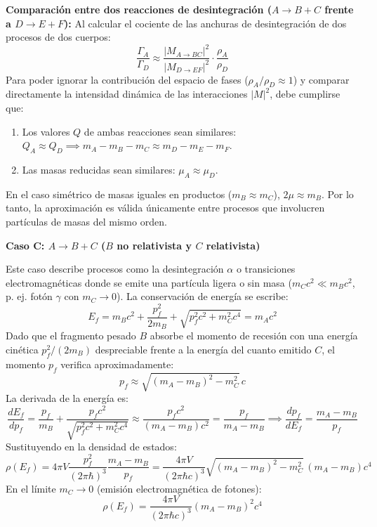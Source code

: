 \textbf{Comparación entre dos reacciones de desintegración ($A \to B + C$ frente a $D \to E + F$):}
Al calcular el cociente de las anchuras de desintegración de dos procesos de dos cuerpos:
\begin{equation}
\frac{\Gamma_A}{\Gamma_D} \approx \frac{|M_{A \to BC}|^2}{|M_{D \to EF}|^2} \cdot \frac{\rho_A}{\rho_D}
\end{equation}
Para poder ignorar la contribución del espacio de fases ($\rho_A / \rho_D \approx 1$) y comparar directamente la intensidad dinámica de las interacciones $|M|^2$, debe cumplirse que:
\begin{enumerate}
    \item Los valores $Q$ de ambas reacciones sean similares: $Q_A \approx Q_D \implies m_A - m_B - m_C \approx m_D - m_E - m_F$.
    \item Las masas reducidas sean similares: $\mu_A \approx \mu_D$.
\end{enumerate}
En el caso simétrico de masas iguales en productos ($m_B \approx m_C$), $2\mu \approx m_B$. Por lo tanto, la aproximación es válida únicamente entre procesos que involucren partículas de masas del mismo orden.

\textbf{Caso C: $A \to B + C$ ($B$ no relativista y $C$ relativista)}

Este caso describe procesos como la desintegración $\alpha$ o transiciones electromagnéticas donde se emite una partícula ligera o sin masa ($m_C c^2 \ll m_B c^2$, p. ej. fotón $\gamma$ con $m_C \to 0$).
La conservación de energía se escribe:
\begin{equation}
E_f = m_B c^2 + \frac{p_f^2}{2m_B} + \sqrt{p_f^2 c^2 + m_C^2 c^4} = m_A c^2
\end{equation}
Dado que el fragmento pesado $B$ absorbe el momento de recesión con una energía cinética $p_f^2 / (2m_B)$ despreciable frente a la energía del cuanto emitido $C$, el momento $p_f$ verifica aproximadamente:
\begin{equation}
p_f \approx \sqrt{(m_A - m_B)^2 - m_C^2} \, c
\end{equation}
La derivada de la energía es:
\begin{equation}
\frac{dE_f}{dp_f} = \frac{p_f}{m_B} + \frac{p_f c^2}{\sqrt{p_f^2 c^2 + m_C^2 c^4}} \approx \frac{p_f c^2}{(m_A - m_B)c^2} = \frac{p_f}{m_A - m_B} \implies \frac{dp_f}{dE_f} = \frac{m_A - m_B}{p_f}
\end{equation}
Sustituyendo en la densidad de estados:
\begin{equation}
\rho(E_f) = 4\pi V \frac{p_f^2}{(2\pi\hbar)^3} \frac{m_A - m_B}{p_f} = \frac{4\pi V}{(2\pi\hbar c)^3} \sqrt{(m_A - m_B)^2 - m_C^2} \, (m_A - m_B) c^4
\end{equation}
En el límite $m_C \to 0$ (emisión electromagnética de fotones):
\begin{equation}
\rho(E_f) = \frac{4\pi V}{(2\pi\hbar c)^3} (m_A - m_B)^2 c^4
\end{equation}

